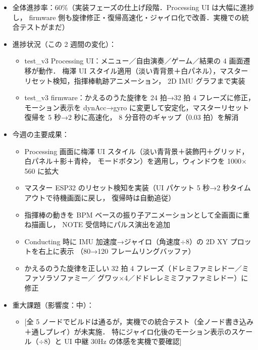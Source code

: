 \documentclass[uplatex,dvipdfmx,a4paper,11pt]{jsarticle}
\begin{document}
\begin{itemize}
  \item 全体進捗率：60\%（実装フェーズの仕上げ段階．Processing UI は大幅に進捗し，
        firmware 側も旋律修正・復帰高速化・ジャイロ化で改善．実機での統合テストがまだ）
  \item 進捗状況（この 2 週間の変化）：
    \begin{itemize}
      \item test\_v3 Processing UI：メニュー／自由演奏／ゲーム／結果の 4 画面遷移が動作．
            梅澤 UI スタイル適用（淡い青背景＋白パネル），マスターリセット検知，指揮棒軌跡アニメーション，
            2D IMU グラフまで実装
      \item test\_v3 firmware：かえるのうた旋律を 24 拍→32 拍 4 フレーズに修正，
            モーション表示を dynAcc→gyro に変更して安定化，マスターリセット復帰を 5 秒→2 秒に高速化，
            8 分音符のギャップ（0.03 拍）を解消
    \end{itemize}
  \item 今週の主要成果：
    \begin{itemize}
      \item Processing 画面に梅澤 UI スタイル（淡い青背景＋装飾円＋グリッド，白パネル＋影＋青枠，
            モードボタン）を適用し，ウィンドウを 1000$\times$560 に拡大
      \item マスター ESP32 のリセット検知を実装（UI パケット 5 秒→2 秒タイムアウトで待機画面に戻し，
            復帰時は自動追従）
      \item 指揮棒の動きを BPM ベースの振り子アニメーションとして全画面に重ね描画し，
            NOTE 受信時にパルス演出を追加
      \item Conducting 時に IMU 加速度→ジャイロ（角速度$\div$8）の 2D XY プロットを右上に表示
            （80→120 フレームリングバッファ）
      \item かえるのうた旋律を正しい 32 拍 4 フレーズ（ドレミファミレドー／ミファソラソファミー／
            グワッ$\times$4／ドドレレミミファファミレドー）に修正
    \end{itemize}
  \item 重大課題（影響度：中）：
    \begin{itemize}
      \item {}[全 5 ノードでビルドは通るが，実機での統合テスト（全ノード書き込み＋通しプレイ）が未実施．
            特にジャイロ化後のモーション表示のスケール（$\div$8）と UI 中継 30Hz の体感を実機で要確認]
    \end{itemize}
\end{itemize}
\end{document}
